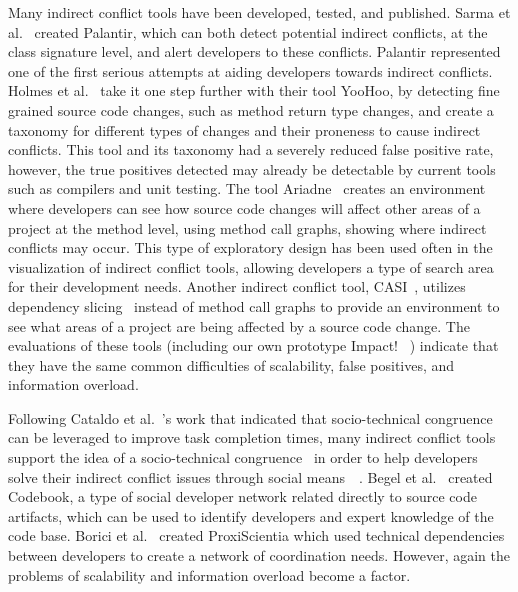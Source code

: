 \documentclass[conference]{IEEEtran}
\begin{document}
Many indirect conflict tools have been developed, tested, and published. Sarma et al.~\cite{Sarma:2007:TSA} created Palantir,
which can both detect potential indirect conflicts, at the class signature level, and alert developers to these conflicts.
Palantir represented one of the first serious attempts at aiding developers towards indirect conflicts. Holmes et
al.~\cite{Holmes:2010:CAR} take it one step further with their tool YooHoo, by detecting fine grained source code changes,
such as method return type changes, and create a taxonomy for different types of changes and their proneness to cause
indirect conflicts. This tool and its taxonomy had a severely reduced false positive rate, however, the true positives
detected may already be detectable by current tools such as compilers and unit testing. The tool Ariadne~\cite{Trainer:2005:BGT}
creates an environment where developers can see how source code changes will affect other areas of a project at the
method level, using method call graphs, showing where indirect conflicts may occur. This type of exploratory design has
been used often in the visualization of indirect conflict tools, allowing developers a type of search area for their development
needs. Another indirect conflict tool, CASI~\cite{Servant:2010:CPI}, utilizes dependency slicing~\cite{Bajracharya:2009:SIS}
instead of method call graphs to provide an environment to see what areas of a project are being affected by a source code change.
The evaluations of these tools (including our own prototype Impact! ~\cite{Ell:2013}) indicate that they have the same common difficulties of scalability, false positives, and information overload.

Following Cataldo et al.~\cite{Cataldo:2006:ICR}'s work that indicated that socio-technical congruence can be leveraged to improve task completion
times, many indirect conflict tools support the idea of a socio-technical congruence~\cite{Kwan:2011:ESC} in order to help
developers solve their indirect conflict issues through social means~\cite{Begel:2010:CDE}~\cite{Borici:2012:CHA}.
Begel et al.~\cite{Begel:2010:CDE} created Codebook, a type of social developer network related directly to source code
artifacts, which can be used to identify developers and expert knowledge of the code base. Borici et al.~\cite{Borici:2012:CHA}
created ProxiScientia which used technical dependencies between developers to create a network of coordination needs.
However, again the problems of scalability and information overload become a factor.
\end{document}
